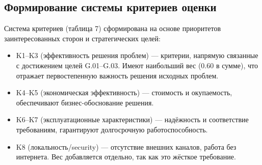 \documentclass[14pt, a4paper]{extarticle}
\begin{document}
		
	\subsection{Формирование системы критериев оценки}
	Система критериев (таблица 7) сформирована на основе приоритетов заинтересованных сторон и стратегических целей:
	
	\begin{itemize}
		\item K1–K3 (эффективность решения проблем) — критерии, напрямую связанные с достижением целей G.01–G.03. Имеют наибольший вес (0.60 в сумме), что отражает первостепенную важность решения исходных проблем.
		\item K4–K5 (экономическая эффективность) — стоимость и окупаемость, обеспечивают бизнес-обоснование решения.
		\item K6–K7 (эксплуатационные характеристики) — надёжность и соответствие требованиям, гарантируют долгосрочную работоспособность.
		\item K8 (локальность/security) — отсутствие внешних каналов, работа без интернета. Вес добавляется отдельно, так как это жёсткое требование.
	\end{itemize}
	
\end{document}

